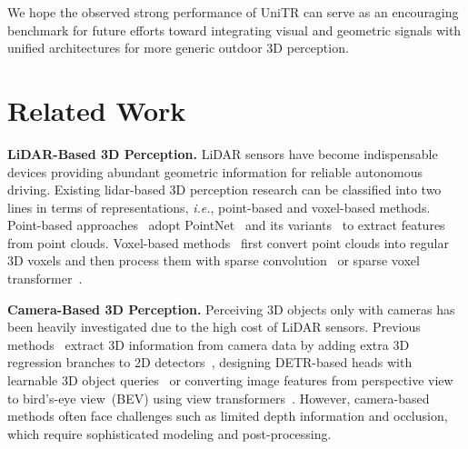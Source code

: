 \documentclass[10pt,twocolumn,letterpaper]{article}
\begin{document}
We hope the observed strong performance of UniTR can serve as an encouraging benchmark for future efforts toward integrating visual and geometric signals with unified architectures for more generic outdoor 3D perception.


\section{Related Work}
\noindent \textbf{LiDAR-Based 3D Perception.} LiDAR sensors have become indispensable devices providing abundant geometric information for reliable autonomous driving. Existing lidar-based 3D perception research can be classified into two lines in terms of representations, \emph{i.e.}, point-based and voxel-based methods. Point-based approaches~\cite{shi2019pointrcnn,qi2019deep,wang2022rbgnet,yang20203dssd,cheng2021back} adopt PointNet~\cite{qi2017pointnet} and its variants~\cite{qi2018pointnnetplus,liu2019relation} to extract features from point clouds. Voxel-based methods~\cite{yan2018second,shi2020pv,yin2021cvpr,Deng2021VoxelRT,shi2021pv,shi2020p2,wang2022cagroupd,zhu2021cylindrical} first convert point clouds into regular 3D voxels and then process them with sparse convolution~\cite{graham20183d,choy20194d} or sparse voxel transformer~\cite{wang2023dsvt,liu2023flatformer,fan2021embracing,mao2021voxel,dong2022mssvt,yang2022unified,voxelset}.

\noindent \textbf{Camera-Based 3D Perception.} Perceiving 3D objects only with cameras has been heavily investigated due to the high cost of LiDAR sensors. Previous methods~\cite{wang2021fcos3d,wang2022detr3d,liu2022petr,philion2020lift,li2022bevformer} extract 3D information from camera data by adding extra 3D regression branches to 2D detectors~\cite{wang2021fcos3d}, designing DETR-based heads with learnable 3D object queries~\cite{wang2022detr3d,liu2022petr} or converting image features from perspective view to bird's-eye view~(BEV) using view transformers~\cite{philion2020lift,huang2021bevdet,li2022bevformer}. However, camera-based methods often face challenges such as limited depth information and occlusion, which require sophisticated modeling and post-processing.
\end{document}
